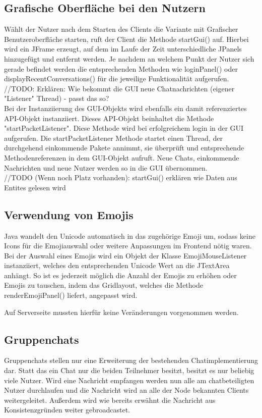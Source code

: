 
\author{Jan Grübener, Patrick Mischka}
\subsection{Grafische Oberfläche bei den Nutzern}
Wählt der Nutzer nach dem Starten des Clients die Variante mit Grafischer Benutzeroberfläche starten, ruft der Client die Methode startGui() auf. Hierbei wird ein JFrame erzeugt, auf dem im Laufe der Zeit unterschiedliche JPanels hinzugefügt und entfernt werden. Je nachdem an welchem Punkt der Nutzer sich gerade befindet werden die entsprechenden Methoden wie loginPanel() oder displayRecentConversations() für die jeweilige Funktionalität aufgerufen. \\

//TODO: Erklären: Wie bekommt die GUI neue Chatnachrichten (eigener "Listener" Thread) - passt das so? \\
Bei der Instanziierung des GUI-Objekts wird ebenfalls ein damit referenziertes 
API-Objekt instanziiert. Dieses API-Objekt beinhaltet die Methode 
"startPacketListener". Diese Methode wird bei erfolgreichem login in der GUI 
aufgerufen. Die startPacketListener Methode startet einen Thread, der durchgehend 
einkommende Pakete annimmt, sie überprüft und entsprechende Methodenreferenzen in dem 
GUI-Objekt aufruft. Neue Chats, einkommende Nachrichten und neue Nutzer werden so 
in die GUI übernommen.\\

//TODO (Wenn noch Platz vorhanden): startGui() erklären wie Daten aus Entites gelesen wird
\author{Jan Grübener, Patrick Mischka}
\subsection{Verwendung von Emojis}
Java wandelt den Unicode automatisch in das zugehörige Emoji um, sodass keine Icons für die Emojiauswahl oder weitere Anpassungen im Frontend nötig waren. Bei der Auswahl eines Emojis wird ein Objekt der Klasse EmojiMouseListener instanziiert, welches den entsprechenden Unicode Wert an die JTextArea anhängt. So ist es jederzeit möglich die Anzahl der Emojis zu erhöhen oder Emojis zu tauschen, indem das Gridlayout, welches die Methode renderEmojiPanel() liefert, angepasst wird.

Auf Serverseite mussten hierfür keine Veränderungen vorgenommen werden.

\author{Matthias Vonend, Aaron Schweig, Troy Keßler}
\subsection{Gruppenchats}
Gruppenchats stellen nur eine Erweiterung der bestehenden Chatimplementierung dar. Statt das ein Chat nur die beiden Teilnehmer besitzt, besitzt es nur beliebig viele Nutzer. Wird eine Nachricht empfangen werden nun alle am chatbeteiligten Nutzer durchlaufen und die Nachricht wird an alle der Node bekannten Clients weitergeleitet. Außerdem wird wie bereits erwähnt die Nachricht aus Konsistenzgründen weiter gebroadcastet.


